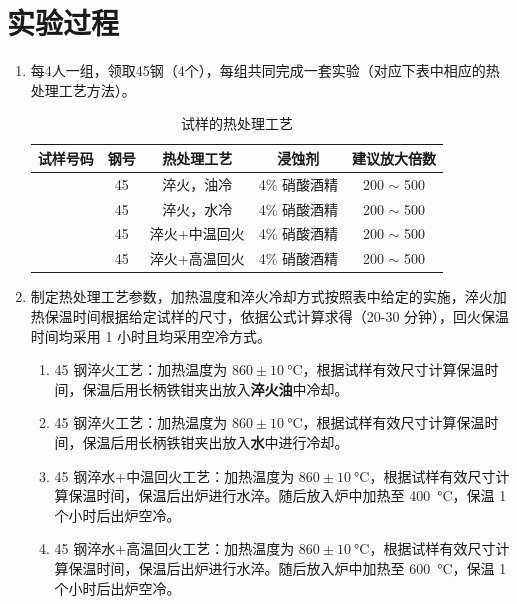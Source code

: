 \documentclass[a4paper,utf8]{article}
\begin{document}
\section{实验过程}%
    \begin{enumerate}
        \item 每4人一组，领取45钢（4个），每组共同完成一套实验（对应下表中相应的热处理工艺方法）。
        \begin{table}[!ht]\centering
            \caption{试样的热处理工艺}
             \newcommand{\Sam}{\stepcounter{sample}\thesample}
            \begin{tabular}{c c c c c}\hline
                试样号码 & 钢号 & 热处理工艺 & 浸蚀剂 & 建议放大倍数 \\ \hline
                \Sam & 45 & 淬火，油冷 & 4\% 硝酸酒精 & 200 $\sim$ 500 \\ \hline
                \Sam & 45 & 淬火，水冷 & 4\% 硝酸酒精 & 200 $\sim$ 500 \\ \hline
                \Sam & 45 & 淬火+中温回火 & 4\% 硝酸酒精 & 200 $\sim$ 500 \\ \hline
                \Sam & 45 & 淬火+高温回火 & 4\% 硝酸酒精 & 200 $\sim$ 500 \\ \hline
            \end{tabular}
        \end{table}
        \item 制定热处理工艺参数，加热温度和淬火冷却方式按照表中给定的实施，淬火加热保温时间根据给定试样的尺寸，依据公式计算求得（20-30 分钟），回火保温时间均采用 1 小时且均采用空冷方式。
        \begin{enumerate}
            \item 45 钢淬火工艺：加热温度为 $860 \pm \SI{10}{\degreeCelsius}$，根据试样有效尺寸计算保温时间，保温后用长柄铁钳夹出放入\textbf{淬火油}中冷却。
            \item 45 钢淬火工艺：加热温度为 $860 \pm \SI{10}{\degreeCelsius}$，根据试样有效尺寸计算保温时间，保温后用长柄铁钳夹出放入\textbf{水}中进行冷却。
            \item 45 钢淬水+中温回火工艺：加热温度为 $860 \pm \SI{10}{\degreeCelsius}$，根据试样有效尺寸计算保温时间，保温后出炉进行水淬。随后放入炉中加热至 \SI{400}{\degreeCelsius}，保温 1 个小时后出炉空冷。
            \item 45 钢淬水+高温回火工艺：加热温度为 $860 \pm \SI{10}{\degreeCelsius}$，根据试样有效尺寸计算保温时间，保温后出炉进行水淬。随后放入炉中加热至 \SI{600}{\degreeCelsius}，保温 1 个小时后出炉空冷。

\end{enumerate}
\end{enumerate}
\end{document}
